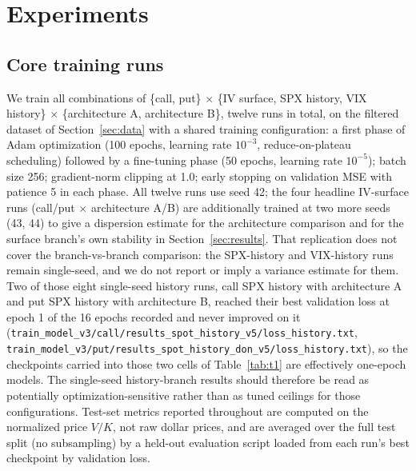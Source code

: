 \documentclass[11pt]{article}
\begin{document}
\section{Experiments}
\label{sec:experiments}

\subsection{Core training runs}
We train all combinations of \{call, put\} $\times$ \{IV surface, SPX history, VIX history\} $\times$
\{architecture A, architecture B\}, twelve runs in total, on the filtered dataset of
Section~\ref{sec:data} with a shared training configuration: a first phase of Adam optimization (100
epochs, learning rate $10^{-3}$, reduce-on-plateau scheduling) followed by a fine-tuning phase (50
epochs, learning rate $10^{-5}$); batch size 256; gradient-norm clipping at 1.0; early stopping on
validation MSE with patience 5 in each phase. All twelve runs use seed 42; the four headline
IV-surface runs (call/put $\times$ architecture A/B) are additionally trained at two more seeds (43,
44) to give a dispersion estimate for the architecture comparison and for the surface branch's own
stability in Section~\ref{sec:results}. That replication does not cover the branch-vs-branch
comparison: the SPX-history and VIX-history runs remain single-seed, and we do not report or imply a
variance estimate for them. Two of those eight single-seed history runs, call SPX history with
architecture A and put SPX history with architecture B, reached their best validation loss at epoch 1
of the 16 epochs recorded and never improved on it
(\texttt{train\_model\_v3/call/results\_spot\_history\_v5/loss\_history.txt},
\texttt{train\_model\_v3/put/results\_spot\_history\_don\_v5/loss\_history.txt}), so the checkpoints
carried into those two cells of Table~\ref{tab:t1} are effectively one-epoch models. The single-seed
history-branch results should therefore be read as potentially optimization-sensitive rather than as
tuned ceilings for those configurations. Test-set metrics reported throughout are computed on the
normalized price $V/K$, not raw dollar prices, and are averaged over the full test split (no
subsampling) by a held-out evaluation script loaded from each run's best checkpoint by validation
loss.
\end{document}

